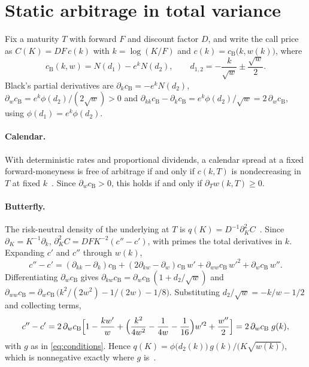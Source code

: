 \section{Static arbitrage in total variance}
\label{app:arbitrage}

Fix a maturity $T$ with forward $F$ and discount factor $D$, and write the call price as
$C(K)=DF\,c(k)$ with $k=\log(K/F)$ and $c(k)=c_{\text{B}}\bigl(k,w(k)\bigr)$, where
\[
  c_{\text{B}}(k,w)=N(d_1)-e^{k}N(d_2),\qquad d_{1,2}=-\frac{k}{\sqrt w}\pm\frac{\sqrt w}{2}.
\]
Black's partial derivatives are $\partial_k c_{\text{B}}=-e^kN(d_2)$,
$\partial_w c_{\text{B}}=e^k\phi(d_2)/(2\sqrt w)>0$ and
$\partial_{kk}c_{\text{B}}-\partial_k c_{\text{B}}=e^k\phi(d_2)/\sqrt w=2\,\partial_w c_{\text{B}}$, using
$\phi(d_1)=e^k\phi(d_2)$.

\paragraph{Calendar.} With deterministic rates and proportional dividends, a calendar spread at a
fixed forward-moneyness is free of arbitrage if and only if $c(k,T)$ is nondecreasing in $T$ at fixed
$k$~\citep{carr2005,gatheral2014}. Since $\partial_w c_{\text{B}}>0$, this holds if and only if
$\partial_T w(k,T)\ge 0$.

\paragraph{Butterfly.} The risk-neutral density of the underlying at $T$ is
$q(K)=D^{-1}\partial^2_K C$~\citep{breeden1978}. Since $\partial_K=K^{-1}\partial_k$,
$\partial^2_K C=DF K^{-2}(c''-c')$, with primes the total derivatives in $k$. Expanding $c'$ and $c''$
through $w(k)$,
\[
  c''-c'=(\partial_{kk}-\partial_k)c_{\text{B}}+(2\partial_{kw}-\partial_w)c_{\text{B}}\,w'
  +\partial_{ww}c_{\text{B}}\,w'^2+\partial_w c_{\text{B}}\,w''.
\]
Differentiating $\partial_w c_{\text{B}}$ gives $\partial_{kw}c_{\text{B}}=\partial_w c_{\text{B}}\,(1+d_2/\sqrt w)$ and
$\partial_{ww}c_{\text{B}}=\partial_w c_{\text{B}}\,\bigl(k^2/(2w^2)-1/(2w)-1/8\bigr)$. Substituting
$d_2/\sqrt w=-k/w-1/2$ and collecting terms,
\[
  c''-c'=2\,\partial_w c_{\text{B}}\Bigl[1-\frac{kw'}{w}+\Bigl(\frac{k^2}{4w^2}-\frac{1}{4w}-\frac1{16}\Bigr)w'^2+\frac{w''}{2}\Bigr]
  =2\,\partial_w c_{\text{B}}\;g(k),
\]
with $g$ as in \cref{eq:conditions}. Hence $q(K)=\phi\bigl(d_2(k)\bigr)\,g(k)/\bigl(K\sqrt{w(k)}\bigr)$,
which is nonnegative exactly where $g$ is~\citep{gatheral2014}.

